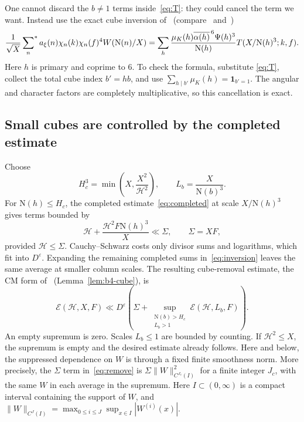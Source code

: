 \documentclass[11pt]{article}
\numberwithin{equation}{section}
\newcommand{\N}{\mathrm N}
\newcommand{\muk}{\mu_K}
\newcommand{\ind}{\mathbf1}
\newcommand{\E}{\mathcal E}
\newcommand{\ssum}{\sideset{}{^*}\sum}
\begin{document}
One cannot discard the $b\ne1$ terms inside~\eqref{eq:T}: they could
cancel the term we want. Instead use the exact cube inversion of~\cite[Section~5.3]{OAI1112} (compare~\cite[Theorem~6.1]{Pat77} and~\cite[Section~5]{DR})
\begin{equation}\label{eq:inversion}
 \frac1{\sqrt X}\ssum_n a_\xi(n)\chi_n(k)\chi_n(f)^4W(\N(n)/X)
 =\sum_h\frac{\muk(h)\overline{\alpha(h)}^{\,6}\Psi(h)^3}{\N(h)}
                  T(X/\N(h)^3;k,f).
\end{equation}
Here $h$ is primary and coprime to $6$. To check the formula, substitute
\eqref{eq:T}, collect the total cube index $b'=hb$, and use
$\sum_{h\mid b'}\muk(h)=\ind_{b'=1}$. The angular and character
factors are completely multiplicative, so this cancellation is exact.

\subsection{Small cubes are controlled by the completed estimate}
Choose
\begin{equation}\label{eq:Hc}
 H_c^3=\min\left(X,\frac{X^2}{\mathcal H^2}\right),\qquad
 L_b=\frac X{\N(b)^3}.
\end{equation}
For $\N(h)\le H_c$, the completed estimate~\eqref{eq:completed} at
scale $X/\N(h)^3$ gives terms bounded by
\begin{equation}\label{eq:smallcubes}
 \mathcal H+\frac{\mathcal H^2F\N(h)^3}X\ll\Sigma,
 \qquad\Sigma=XF,
\end{equation}
provided $\mathcal H\le\Sigma$. Cauchy--Schwarz costs only divisor sums
and logarithms, which fit into $D^\varepsilon$.
Expanding the remaining completed sums in~\eqref{eq:inversion} leaves
the same average at smaller column scales. The resulting cube-removal
estimate, the CM form of~\cite[Lemma~5.3]{OAI1112} (Lemma~\ref{lem:b4-cube}), is
\begin{equation}\label{eq:remove}
 \E(\mathcal H,X,F)\ll D^\varepsilon
 \left(\Sigma+
  \sup_{\substack{\N(b)>H_c\\L_b>1}}\E(\mathcal H,L_b,F)\right).
\end{equation}
An empty supremum is zero. Scales $L_b\le1$ are bounded by counting.
If $\mathcal H^2\le X$, the supremum is empty and the desired estimate
already follows. Here and below, the suppressed dependence on $W$ is
through a fixed finite smoothness norm. More precisely, the $\Sigma$
term in~\eqref{eq:remove} is $\Sigma\|W\|_{C^{J_c}(I)}^2$ for a finite
integer $J_c$, with the same $W$ in each average in the supremum. Here
$I\subset(0,\infty)$ is a compact interval containing the support of $W$,
and $\|W\|_{C^J(I)}=\max_{0\le i\le J}\sup_{x\in I}|W^{(i)}(x)|$.
\end{document}
